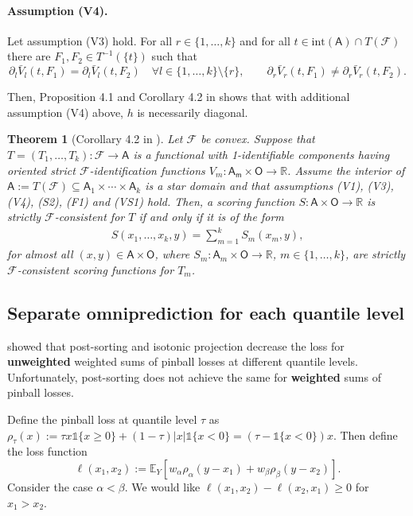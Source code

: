 \documentclass{article}
\newtheorem{theorem}{Theorem}
\newcommand{\indi}[1]{\mathds{1}\{#1\}}
\newcommand{\E}{\mathbb{E}}
\newcommand{\R}{\mathbb{R}}
\newcommand{\cf}{\mathcal{F}}
\begin{document}
\paragraph{Assumption (V4).} Let assumption (V3) hold. For all $r \in \{1, \ldots, k\}$ and for all $t \in \mathrm{int}(\mathsf{A}) \cap T(\cf)$ there are $F_1, F_2 \in T^{-1}(\{t\})$ such that
\[
\partial_l \bar{V}_l(t, F_1) = \partial_l \bar{V}_l(t, F_2) \quad \forall l \in \{1, \ldots, k\} \setminus \{r\}, \qquad \partial_r \bar{V}_r(t, F_1) \neq \partial_r \bar{V}_r(t, F_2).
\]

Then, Proposition 4.1 and Corollary 4.2 in \cite{fissler2016multiq} shows that with additional assumption (V4) above, $h$ is necessarily diagonal.
\begin{theorem}[Corollary 4.2 in \cite{fissler2016multiq}]
Let $\cf$ be convex. Suppose that $T = (T_1, \ldots, T_k): \cf \to \mathsf{A}$ is a functional with 1-identifiable components having oriented strict $\cf$-identification functions $V_m: \mathsf{A_m} \times \mathsf{O} \to \R$. Assume the interior of $\mathsf{A}:=T(\cf) \subseteq \mathsf{A}_1 \times \cdots \times \mathsf{A}_k$ is a star domain and that assumptions (V1), (V3), (V4), (S2), (F1) and (VS1) hold. Then, a scoring function $S: \mathsf{A} \times \mathsf{O} \to \R$ is strictly $\cf$-consistent for $T$ if and only if it is of the form
\begin{align}
    S(x_1, \ldots, x_k, y) = \sum_{m=1}^{k} S_m(x_m, y),
\end{align}
for almost all $(x,y) \in \mathsf{A} \times \mathsf{O}$, where $S_m: \mathsf{A}_m \times \mathsf{O} \to \R$, $m \in \{1, \ldots, k\}$, are strictly $\cf$-consistent scoring functions for $T_m$.
\end{theorem}



\subsection{Separate omniprediction for each quantile level}\label{subsec:separate_multi_q}
\cite{fakoor2023flexible} showed that post-sorting and isotonic projection decrease the loss for \textbf{unweighted} weighted sums of pinball losses at different quantile levels. Unfortunately, post-sorting does not achieve the same for \textbf{weighted} sums of pinball losses.

Define the pinball loss at quantile level $\tau$ as $\rho_\tau(x) := \tau x\indi{x \geq 0} +(1-\tau)|x|\indi{x < 0} = (\tau - \indi{x < 0})x$. Then define the loss function 
\[
\ell(x_1, x_2) := \E_Y [w_\alpha \rho_\alpha (y-x_1) + w_\beta \rho_\beta (y-x_2)].
\] 
Consider the case $\alpha < \beta$. We would like $\ell(x_1, x_2) - \ell(x_2, x_1) \geq 0$ for $x_1 > x_2$. 
\end{document}
